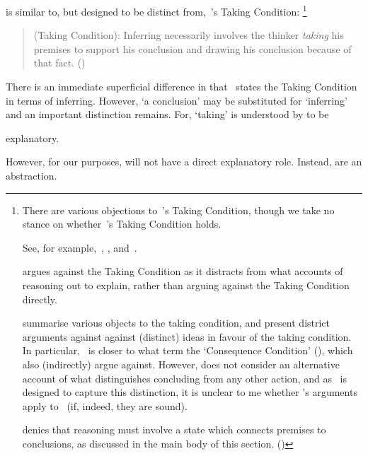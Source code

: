 \begin{note}
 \supportI{} is similar to, but designed to be distinct from,~\citeauthor{Boghossian:2014aa}'s Taking Condition:%
  \footnote{
    There are various objections to~\citeauthor{Boghossian:2014aa}'s Taking Condition, though we take no stance on whether~\citeauthor{Boghossian:2014aa}'s Taking Condition holds.

    See, for example,~\textcite{Hlobil:2014tq}, \textcite{McHugh:2016vp}, and~\textcite{Wright:2014tt}.

    \citeauthor{Hlobil:2014tq} argues against the Taking Condition as it distracts from what accounts of reasoning out to explain, rather than arguing against the Taking Condition directly.

    \citeauthor{McHugh:2016vp} summarise various objects to the taking condition, and present district arguments against against (distinct) ideas in favour of the taking condition.
    In particular,~\supportI{} is closer to what \citeauthor{McHugh:2016vp} term the `Consequence Condition' (\citeyear[cf.][316]{McHugh:2016vp}), which \citeauthor{McHugh:2016vp} also (indirectly) argue against.
    However, \citeauthor{McHugh:2016vp} does not consider an alternative account of what distinguishes concluding from any other action, and as~\supportI{} is designed to capture this distinction, it is unclear to me whether \citeauthor{McHugh:2016vp}'s arguments apply to~\supportI{} (if, indeed, they are sound).

    \citeauthor{Wright:2014tt} denies that reasoning must involve a state which connects premises to conclusions, as discussed in the main body of this section. (\citeyear[Cf.][33-34]{Wright:2014tt})
  }

  \begin{quote}
    (Taking Condition):
    Inferring necessarily involves the thinker \emph{taking} his premises to support his conclusion and drawing his conclusion because of that fact.%
    \mbox{}\hfill\mbox{(\citeyear[5]{Boghossian:2014aa})}
  \end{quote}

  There is an immediate superficial difference in that~\citeauthor{Boghossian:2014aa} states the Taking Condition in terms of inferring.
  However, `a conclusion' may be substituted for `inferring' and an important distinction remains.
  For, `taking' is understood by \citeauthor{Boghossian:2014aa} to be {
    \color{red}
    explanatory.

    However, for our purposes,  will not have a direct explanatory role.
  Instead,  are an abstraction.
}
\end{note}


